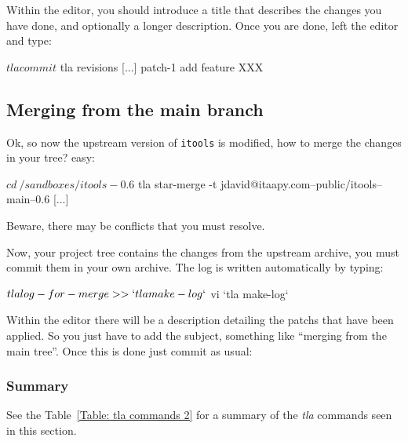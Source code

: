 Within the editor, you should introduce a title that describes the changes
you have done, and optionally a longer description. Once you are done,
left the editor and type:

\begin{code}
    $ tla commit
    $ tla revisions
    [...]
    patch-1
        add feature XXX
\end{code}


\subsection{Merging from the main branch}

Ok, so now the upstream version of {\tt itools} is modified, how to merge
the changes in your tree? easy:

\begin{code}
    $ cd ~/sandboxes/itools-0.6
    $ tla star-merge -t jdavid@itaapy.com--public/itools--main--0.6
    [...]
\end{code}

Beware, there may be conflicts that you must resolve.

Now, your project tree contains the changes from the upstream archive,
you must commit them in your own archive. The log is written automatically
by typing:

\begin{code}
    $ tla log-for-merge >> `tla make-log`
    $ vi `tla make-log`
\end{code}

Within the editor there will be a description detailing the patchs that
have been applied. So you just have to add the subject, something like
``merging from the main tree''. Once this is done just commit as usual:



\subsubsection{Summary}

See the Table~\ref{Table: tla commands 2} for a summary of the {\em tla}
commands seen in this section.

